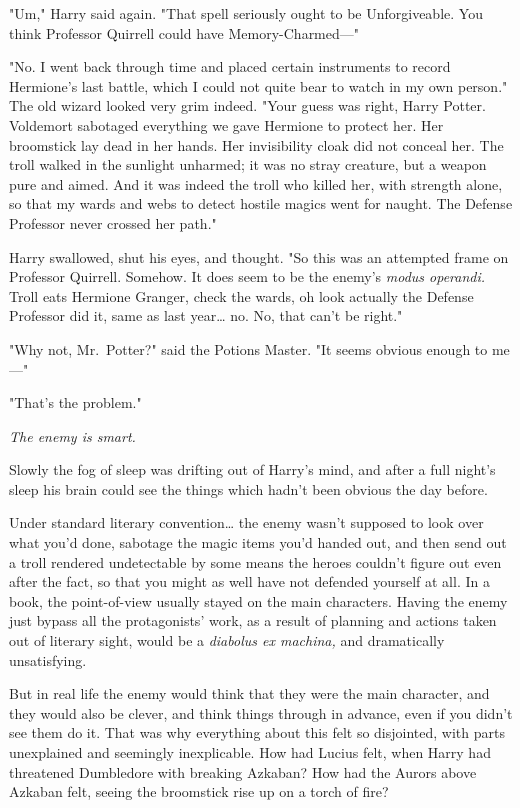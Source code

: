 "Um," Harry said again. "That spell seriously ought to be Unforgiveable. You 
think Professor Quirrell could have Memory-Charmed---"

"No. I went back through time and placed certain instruments to record 
Hermione's last battle, which I could not quite bear to watch in my own 
person." The old wizard looked very grim indeed. "Your guess was right, Harry 
Potter. Voldemort sabotaged everything we gave Hermione to protect her. Her 
broomstick lay dead in her hands. Her invisibility cloak did not conceal her. 
The troll walked in the sunlight unharmed; it was no stray creature, but a 
weapon pure and aimed. And it was indeed the troll who killed her, with 
strength alone, so that my wards and webs to detect hostile magics went for 
naught. The Defense Professor never crossed her path."

Harry swallowed, shut his eyes, and thought. "So this was an attempted frame on 
Professor Quirrell. Somehow. It does seem to be the enemy's \emph{modus 
operandi.} Troll eats Hermione Granger, check the wards, oh look actually the 
Defense Professor did it, same as last year{\ldots} no. No, that can't be 
right."

"Why not, Mr.~Potter?" said the Potions Master. "It seems obvious enough to 
me---"

"That's the problem."

\emph{The enemy is smart.}

Slowly the fog of sleep was drifting out of Harry's mind, and after a full 
night's sleep his brain could see the things which hadn't been obvious the day 
before.

Under standard literary convention{\ldots} the enemy wasn't supposed to look 
over what you'd done, sabotage the magic items you'd handed out, and then send 
out a troll rendered undetectable by some means the heroes couldn't figure out 
even after the fact, so that you might as well have not defended yourself at 
all. In a book, the point-of-view usually stayed on the main characters. Having 
the enemy just bypass all the protagonists' work, as a result of planning and 
actions taken out of literary sight, would be a \emph{diabolus ex machina,} and 
dramatically unsatisfying.

But in real life the enemy would think that they were the main character, and 
they would also be clever, and think things through in advance, even if you 
didn't see them do it. That was why everything about this felt so disjointed, 
with parts unexplained and seemingly inexplicable. How had Lucius felt, when 
Harry had threatened Dumbledore with breaking Azkaban? How had the Aurors above 
Azkaban felt, seeing the broomstick rise up on a torch of fire?

